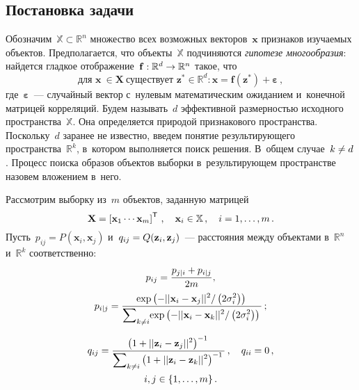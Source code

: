 \begin{multicols}{2}
\section{Постановка задачи}

Обозначим~$\mathbb X \subset \mathbb R^n$ множество всех возможных 
векторов~$\mathbf x$ признаков изучаемых объектов.
Предполагается, что объекты~$\mathbb X$ подчиняются
\textit{гипотезе многообразия}: найдется гладкое 
отображение~$\mathbf f: \mathbb {R}^{d} \hm\to \mathbb {R}^{n}$ такое, что
$$
\mbox{для~} \mathbf x~ \in \mathbf{X}~\mbox{существует~} \mathbf z^* \in 
\mathbb{R}^{d}: \mathbf x = \mathbf{f}(\mathbf z^*) + \boldsymbol{\varepsilon}\,,
$$
где~$\boldsymbol{\varepsilon}$~--- случайный вектор с~нулевым 
математическим ожиданием и~конечной матрицей корреляций. Будем называть~$d$ 
эффективной размерностью исходного пространства~$\mathbb X$. 
Она определяется природой признакового пространства. Поскольку~$d$ 
заранее не известно, введем понятие результирующего пространства~$\mathbb {R}^{k}$, в~котором выполняется поиск решения. В~общем случае~$k \hm\ne d$. Процесс поиска 
образов объектов выборки в~результирующем пространстве назовем вложением в~него.

Рассмотрим выборку из~$m$ объектов, заданную матрицей
\begin{equation}
\label{X}\mathbf X = 
\left[\mathbf x_{1} \cdots \mathbf x_{m}\right]^{{\sf T}}\,, 
\quad \mathbf x_i \in \mathbb X\,, \quad i = 1, \dots, m\,.
\end{equation}
Пусть~$p_{ij} = P(\mathbf x_i, \mathbf x_j)$ и~$q_{ij} 
\hm= Q(\mathbf z_i, \mathbf z_j)$~--- расстояния между объектами 
в~$\mathbb R^n$ и~$\mathbb {R}^{k}$ соответственно:
\begin{multline*}
p_{ij} = \displaystyle\frac{\displaystyle p_{j|i} + p_{i|j}\mathstrut}{\displaystyle 2m\mathstrut}, \\
p_{i|j} = \displaystyle\frac{\displaystyle \exp\left(-
{||\mathbf x_i - \mathbf x_j||^2}/
\left({2\sigma_i^2}\right)\right)\mathstrut}{\displaystyle \sum\nolimits_{k\ne i}\hspace*{-2pt}\exp\left(-{||\mathbf x_i - \mathbf x_k||^2}/
\left({2\sigma_i^2}\right)\right)\mathstrut}\,;
\end{multline*}

\vspace*{-12pt}

\noindent
\begin{multline*}
q_{ij} = \displaystyle\frac{\displaystyle \left(1 + ||\mathbf z_i - \mathbf z_j||^2\right)^{-1}\mathstrut}{\displaystyle \sum\nolimits_{k\ne i}
\left(1 + ||\mathbf z_i - \mathbf z_k||^2\right)^{-1}\mathstrut}\,,\quad q_{ii} = 0\,, 
\\
i, j \in\{1,\dots,m\}\,.
\end{multline*}


\end{multicols}
